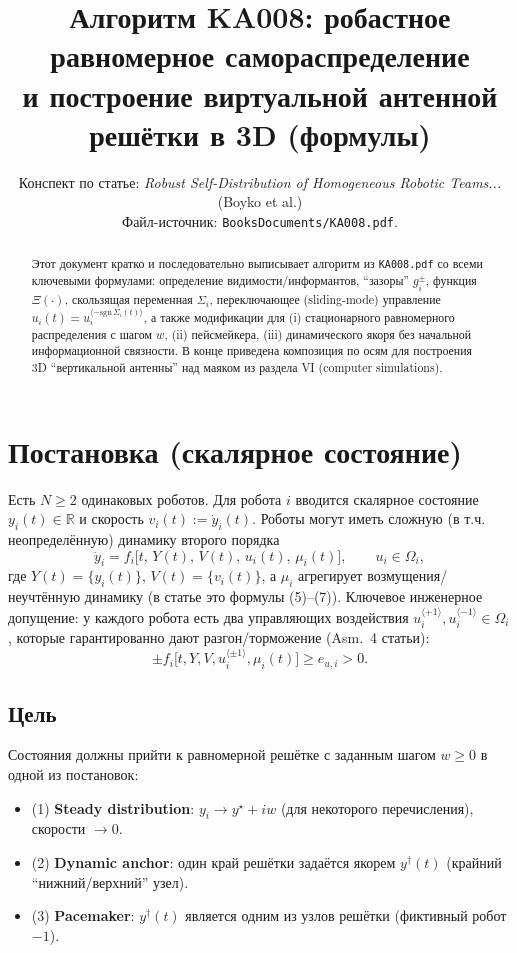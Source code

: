 \documentclass[12pt,a4paper]{article}
\title{Алгоритм KA008: робастное равномерное самораспределение\\
и построение виртуальной антенной решётки в 3D (формулы)}
\author{Конспект по статье: \textit{Robust Self-Distribution of Homogeneous Robotic Teams...} (Boyko et al.)\\
Файл-источник: \texttt{BooksDocuments/KA008.pdf}.}
\date{}
\begin{document}
\maketitle

\begin{abstract}
Этот документ кратко и последовательно выписывает алгоритм из \texttt{KA008.pdf} со всеми ключевыми формулами:
определение видимости/информантов, ``зазоры'' $g_i^\pm$, функция $\Xi(\cdot)$, скользящая переменная $\Sigma_i$,
переключающее (sliding-mode) управление $u_i(t)=u_i^{\langle-\mathrm{sgn}\,\Sigma_i(t)\rangle}$,
а также модификации для (i) стационарного равномерного распределения с шагом $w$, (ii) пейсмейкера, (iii) динамического якоря
без начальной информационной связности. В конце приведена композиция по осям для построения 3D ``вертикальной антенны'' над маяком
из раздела VI (computer simulations).
\end{abstract}

\section{Постановка (скалярное состояние)}

Есть $N\ge 2$ одинаковых роботов. Для робота $i$ вводится скалярное состояние $y_i(t)\in\mathbb{R}$ и скорость
$v_i(t):=\dot y_i(t)$. Роботы могут иметь сложную (в т.ч. неопределённую) динамику второго порядка
\begin{equation}
  \ddot y_i = f_i\bigl[t,\,Y(t),\,V(t),\,u_i(t),\,\mu_i(t)\bigr], \qquad u_i\in\Omega_i,
\end{equation}
где $Y(t)=\{y_i(t)\}$, $V(t)=\{v_i(t)\}$, а $\mu_i$ агрегирует возмущения/неучтённую динамику (в статье это формулы (5)--(7)).
Ключевое инженерное допущение: у каждого робота есть два управляющих воздействия
$u_i^{\langle+1\rangle},u_i^{\langle-1\rangle}\in\Omega_i$, которые гарантированно дают разгон/торможение (Asm.~4 статьи):
\begin{equation}
  \pm f_i\bigl[t,Y,V,u_i^{\langle\pm1\rangle},\mu_i(t)\bigr] \ge e_{u,i} > 0.
  \label{eq:asm4}
\end{equation}

\subsection*{Цель}

Состояния должны прийти к равномерной решётке с заданным шагом $w\ge 0$ в одной из постановок:
\begin{itemize}
  \item (1) \textbf{Steady distribution}: $y_i\to y^\star + i w$ (для некоторого перечисления), скорости $\to 0$.
  \item (2) \textbf{Dynamic anchor}: один край решётки задаётся якорем $y^\dagger(t)$ (крайний ``нижний/верхний'' узел).
  \item (3) \textbf{Pacemaker}: $y^\dagger(t)$ является одним из узлов решётки (фиктивный робот $-1$).
\end{itemize}
\end{document}
